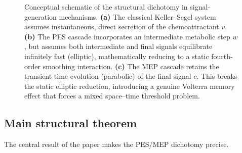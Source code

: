 \documentclass[11pt,reqno]{amsart}
\theoremstyle{definition}
\theoremstyle{remark}
\begin{document}
\begin{figure}[htbp]
{%
    }
    
    \caption{Conceptual schematic of the structural dichotomy in signal-generation mechanisms. \textbf{(a)} The classical Keller--Segel system assumes instantaneous, direct secretion of the chemoattractant $v$. \textbf{(b)} The PES cascade incorporates an intermediate metabolic step $w$, but assumes both intermediate and final signals equilibrate infinitely fast (elliptic), mathematically reducing to a static fourth-order smoothing interaction. \textbf{(c)} The MEP cascade retains the transient time-evolution (parabolic) of the final signal $c$. This breaks the static elliptic reduction, introducing a genuine Volterra memory effect that forces a mixed space--time threshold problem.}
    \label{fig:mechanisms_schematic}
\end{figure}

\subsection{Main structural theorem}
\label{subsec:main-thm}

The central result of the paper makes the PES/MEP dichotomy precise.
\end{document}
